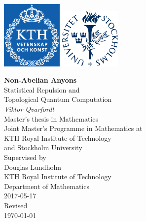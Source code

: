 


\usepackage[pass]{geometry}




\begin{titlepage}
  \noindent\includegraphics[width=3cm]{img/kth}
  \hfill
  \includegraphics[width=3cm]{img/su.eps} \\
  \centering
  \par
  \vspace{3cm}
  {\Huge\textbf{Non-Abelian Anyons}}\\[1em]
  {\huge Statistical Repulsion and\\[0.3em]Topological Quantum Computation} \\
  \vspace{1.75cm}
  \large
  {\large\textit{Viktor Qvarfordt}} \\
  \vspace{1.75cm}
  Master's thesis in Mathematics \\
  \vspace{0.75cm}
  Joint Master's Programme in Mathematics at \\
  KTH Royal Institute of Technology \\
  and Stockholm University \\
  \vspace{1.75cm}
  Supervised by \\[0.5em]
  Douglas Lundholm \\[0.5em]
  KTH Royal Institute of Technology \\
  Department of Mathematics \\
  \vspace{1.75cm}
  2017-05-17 \\
  \vspace{1cm}
  Revised\\[0.5em]
  \isodate\today
\end{titlepage}
\restoregeometry



\tableofcontents
\newpage










\appendix


\backmatter



